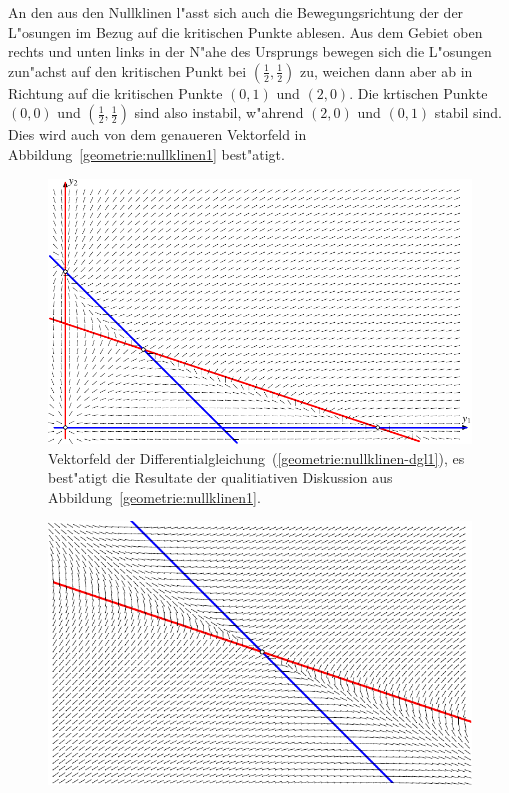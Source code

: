 \begin{beispiel}
An den aus den Nullklinen l"asst sich auch die Bewegungsrichtung der
der L"osungen im Bezug auf die kritischen Punkte ablesen.
Aus dem Gebiet oben rechts und unten links in der N"ahe des Ursprungs
bewegen sich die L"osungen zun"achst auf den kritischen Punkt
bei $(\frac12,\frac12)$ zu, weichen dann aber ab in Richtung auf die
kritischen Punkte $(0,1)$ und $(2,0)$.
Die krtischen Punkte $(0,0)$ und $(\frac12,\frac12)$ sind also
instabil, w"ahrend $(2,0)$ und $(0,1)$ stabil sind.
Dies wird auch von dem genaueren Vektorfeld in
Abbildung~\ref{geometrie:nullklinen1} best"atigt.
\begin{figure}
\centering
\includegraphics{chapters/images/nullklinen-2.pdf}
\caption{Vektorfeld der Differentialgleichung~(\ref{geometrie:nullklinen-dgl1}),
es best"atigt die Resultate der qualitiativen Diskussion aus
Abbildung~\ref{geometrie:nullklinen1}.
\label{geometrie:nullklinen-fluss}}
\end{figure}
\begin{figure}
\centering
\includegraphics{chapters/images/nullklinen-3.pdf}

\end{figure}
\end{beispiel}
